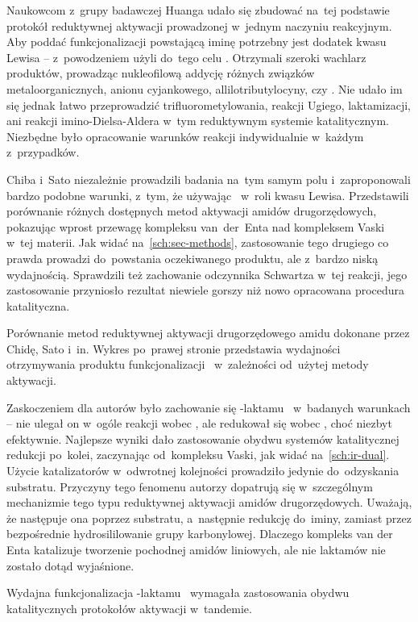 Naukowcom z~grupy badawczej Huanga udało się zbudować na~tej podstawie protokół reduktywnej
  aktywacji prowadzonej w~jednym naczyniu reakcyjnym.
Aby poddać funkcjonalizacji powstającą iminę potrzebny jest dodatek kwasu Lewisa \---
  \citeauthor{ou18} z~powodzeniem użyli do~tego celu .
Otrzymali szeroki wachlarz produktów, prowadząc nukleofilową addycję różnych związków
  metaloorganicznych, anionu cyjankowego, allilotributylocyny, czy .
Nie udało im się jednak łatwo przeprowadzić trifluorometylowania, reakcji Ugiego, laktamizacji,
  ani reakcji imino-Dielsa-Aldera w~tym reduktywnym systemie katalitycznym.
Niezbędne było opracowanie warunków reakcji indywidualnie w~każdym z~przypadków.

Chiba i~Sato niezależnie prowadzili badania na~tym samym polu i~zaproponowali bardzo podobne
  warunki, z~tym, że używając~ w~roli kwasu Lewisa.
Przedstawili porównanie różnych dostępnych metod aktywacji amidów drugorzędowych,
  pokazując wprost przewagę kompleksu van~der~Enta nad kompleksem Vaski w~tej materii.
Jak widać na~\cref{sch:sec-methods}, zastosowanie tego drugiego co prawda prowadzi
  do~powstania oczekiwanego produktu, ale z~bardzo niską wydajnością.
Sprawdzili też zachowanie odczynnika Schwartza w~tej reakcji, jego zastosowanie przyniosło
  rezultat niewiele gorszy niż nowo opracowana procedura katalityczna.
\begin{scheme*}
  
  \caption{
    Porównanie metod reduktywnej aktywacji drugorzędowego amidu dokonane przez Chidę, Sato i~in.
    Wykres po~prawej stronie przedstawia wydajności otrzymywania produktu
      funkcjonalizacji~ w~zależności od~użytej metody aktywacji.
  }
  \label{sch:sec-methods}
\end{scheme*}

Zaskoczeniem dla autorów było zachowanie się \textgamma{}-laktamu~
  w~badanych warunkach \--- nie ulegał on w~ogóle reakcji wobec ,
  ale redukował się wobec \vaska{}, choć niezbyt efektywnie.
Najlepsze wyniki dało zastosowanie obydwu systemów katalitycznej redukcji po~kolei,
  zaczynając od~kompleksu Vaski, jak widać na~\cref{sch:ir-dual}.
Użycie katalizatorów w~odwrotnej kolejności prowadziło jedynie do~odzyskania substratu.
Przyczyny tego fenomenu autorzy dopatrują się w~szczególnym mechanizmie tego typu
  reduktywnej aktywacji amidów drugorzędowych.
Uważają, że następuje ona poprzez  substratu, a~następnie redukcję do~iminy,
  zamiast przez bezpośrednie hydrosililowanie grupy karbonylowej.
Dlaczego kompleks van der Enta katalizuje tworzenie  pochodnej amidów liniowych,
  ale nie laktamów nie zostało dotąd wyjaśnione.
\begin{scheme*}
  
  \caption{
    Wydajna funkcjonalizacja \textgamma{}-laktamu~ wymagała zastosowania
      obydwu katalitycznych protokołów aktywacji w~tandemie.
  }
  \label{sch:ir-dual}
\end{scheme*}

